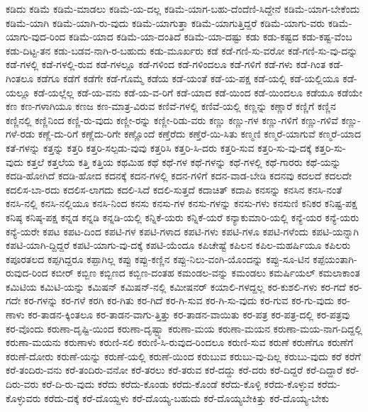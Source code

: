 {ಕಡಿದು
ಕಡಿಮೆ
ಕಡಿಮೆ-ಮಾಡಲು
ಕಡಿಮೆ-ಯ-ದಲ್ಲ
ಕಡಿಮೆ-ಯಾಗ-ಬಹು-ದೆಂದೆಣಿ-ಸಿದ್ದೇನೆ
ಕಡಿಮೆ-ಯಾಗ-ಬೇಕೆಂದು
ಕಡಿಮೆ-ಯಾಗಿ
ಕಡಿಮೆ-ಯಾಗಿ-ರು-ವುದು
ಕಡಿಮೆ-ಯಾಗುತ್ತಾ
ಕಡಿಮೆ-ಯಾಗುತ್ತಿದ್ದರೆ
ಕಡಿಮೆ-ಯಾಗು-ವರು
ಕಡಿಮೆ-ಯಾಗು-ವುದ-ರಿಂದ
ಕಡಿಮೆ-ಯಾದ
ಕಡಿಮೆ-ಯಾ-ದಂತಿದೆ
ಕಡಿಮೆ-ಯಾ-ದಷ್ಟು
ಕಡು
ಕಡು-ಕಷ್ಟದ
ಕಡು-ಕಷ್ಟ-ವೆಂಬ
ಕಡು-ದಿಟ್ಟ-ತನ
ಕಡು-ಬಡವ-ನಾಗಿ-ರ-ಬಹುದು
ಕಡು-ಮೂರ್ಖರು
ಕಡೆ
ಕಡೆ-ಗಣಿ-ಸು-ವರೋ
ಕಡೆ-ಗಣಿ-ಸು-ವು-ದನ್ನು
ಕಡೆ-ಗಳಲ್ಲಿ
ಕಡೆ-ಗಳಲ್ಲಿ-ರುವ
ಕಡೆ-ಗಳಲ್ಲೂ
ಕಡೆ-ಗಳಿಂದ
ಕಡೆ-ಗಳಿಂದಲೂ
ಕಡೆ-ಗಳಿಗೆ
ಕಡೆ-ಗಳು
ಕಡೆ-ಗಿಂತ
ಕಡೆ-ಗಿಂತಲೂ
ಕಡೆಗೂ
ಕಡೆಗೆ
ಕಡೆಗೇ
ಕಡೆ-ಗೊಮ್ಮೆ
ಕಡೆಯ
ಕಡೆ-ಯಂತೆ
ಕಡೆ-ಯ-ಪಕ್ಷ
ಕಡೆ-ಯಲ್ಲಿ
ಕಡೆ-ಯಲ್ಲಿಯೂ
ಕಡೆ-ಯಲ್ಲೂ
ಕಡೆ-ಯಲ್ಲೆಲ್ಲ
ಕಡೆ-ಯ-ವನು
ಕಡೆ-ಯ-ವ-ರಿಗೆ
ಕಡೆ-ಯಾದ
ಕಡೆ-ಯಿಂದ
ಕಡೆ-ಯಿಂದಲೂ
ಕಡೆಯೂ
ಕಡೆಯೇ
ಕಣ
ಕಣ-ಗಳಾಗಿಯೂ
ಕಣಜ
ಕಣ-ಮಾತ್ರ-ವಿರುವ
ಕಣಿವೆ-ಗಳಲ್ಲಿ
ಕಣಿವೆ-ಯಲ್ಲಿ
ಕಣ್ಣನ್ನು
ಕಣ್ಣಾರೆ
ಕಣ್ಣಿಗೆ
ಕಣ್ಣಿನ
ಕಣ್ಣಿನಲ್ಲಿ
ಕಣ್ಣಿನಿಂದ
ಕಣ್ಣಿ-ರು-ವುದು
ಕಣ್ಣೀ-ರನ್ನು
ಕಣ್ಣೀ-ರಿಡು-ವರು
ಕಣ್ಣು
ಕಣ್ಣು-ಗಳ
ಕಣ್ಣು-ಗಳಿಗೆ
ಕಣ್ಣು-ಗಳಿವೆ
ಕಣ್ಣು-ಗಳೆ-ರಡು
ಕಣ್ಣೆ-ದು-ರಿಗೆ
ಕಣ್ಣೆದು-ರಿಗೇ
ಕಣ್ಣೊಂದೆ
ಕಣ್ತೆರೆದು
ಕಣ್ತೆರೆ-ಯಿ-ಸಿತು
ಕಣ್ಮಣಿ
ಕಣ್ಮರೆ-ಯಾಗುವೆ
ಕಣ್ಮರೆ-ಯಾದ
ಕತೆ-ಗಳನ್ನು
ಕತ್ತನ್ನು
ಕತ್ತರಿ
ಕತ್ತರಿ-ಸಲ್ಪಡು-ವುವು
ಕತ್ತರಿಸಿ
ಕತ್ತರಿ-ಸಿ-ದರು
ಕತ್ತರಿ-ಸುವ
ಕತ್ತರಿ-ಸು-ವು-ದಕ್ಕೆ
ಕತ್ತರಿ-ಸು-ವುದು
ಕತ್ತಲೆ
ಕತ್ತಲೆಯ
ಕತ್ತಿ
ಕತ್ತಿಯ
ಕಥಮಿಹ
ಕಥೆ
ಕಥೆ-ಗಳ
ಕಥೆ-ಗಳನ್ನು
ಕಥೆ-ಗಳಲ್ಲಿ
ಕಥೆ-ಗಾರರು
ಕಥೆ-ಯನ್ನು
ಕದಡಿ-ಹೋಗಿದೆ
ಕದಡಿ-ಹೋದ
ಕದನಕ್ಕೆ
ಕದನ-ಗಳಲ್ಲಿ
ಕದನ-ಗಳಿಗೆ
ಕದನ-ವಾಡ-ಬೇಡಿ
ಕದನವು
ಕದಲದೆ
ಕದಲದೇ
ಕದಲಿಸ-ಬಾ-ರದು
ಕದಲಿಸ-ಲಾಗದು
ಕದಲಿ-ಸಿದೆ
ಕದಲಿ-ಸುತ್ತದೆ
ಕದಾಚಿತ್
ಕದಾಪಿ
ಕನಸನ್ನು
ಕನಸಿನ
ಕನಸಿ-ನಂತೆ
ಕನಸಿ-ನಲ್ಲಿ
ಕನಸಿ-ನಲ್ಲಿಯೂ
ಕನಸಿ-ನಿಂದ
ಕನಸು
ಕನಸು-ಗಳ
ಕನಸು-ಗಳನ್ನು
ಕನಸು-ಗಳು
ಕನಸುಣಿ
ಕನಿಕರ
ಕನಿಷ್ಟ-ಪಕ್ಷ
ಕನಿಷ್ಠ
ಕನಿಷ್ಠ-ಪಕ್ಷ
ಕನ್ನಡ
ಕನ್ನಡಿ
ಕನ್ನಡಿ-ಯಲ್ಲಿ
ಕನ್ನಿಕೆ-ಯರು
ಕನ್ನಿಕೆ-ಯರೆ
ಕನ್ಯಾಕುಮಾರಿ-ಯಲ್ಲಿ
ಕನ್ಯೆ-ಯರ
ಕನ್ಯೆ-ಯರು
ಕನ್ಯೆ-ಯರೇ
ಕಪಟ
ಕಪಟ-ದಿಂದ
ಕಪಟಿ-ಗಳ
ಕಪಟಿ-ಗಳಾದ
ಕಪಟಿ-ಗಳು
ಕಪಟಿ-ಗಳೂ
ಕಪಟಿ-ಗಳೆಂದು
ಕಪಟಿ-ಯನ್ನಾಗಿ
ಕಪಟಿ-ಯಾಗಿ-ದ್ದಿದ್ದರೆ
ಕಪಟಿ-ಯಾಗು-ವು-ದಕ್ಕೆ
ಕಪಟಿ-ಯೆಂದೂ
ಕಪಿಚೇಷ್ಟೆ
ಕಪಿಲನ
ಕಪಿಲ-ಮಹರ್ಷಿಯೂ
ಕಪಿಲರು
ಕಪೂರತಲದ
ಕಪ್ಪಗಿದ್ದರೂ
ಕಪ್ಪಾಗಿಲ್ಲ
ಕಪ್ಪು
ಕಪ್ಪು-ಕಣ್ಣಿನ
ಕಪ್ಪು-ನಿಲು-ವಂಗಿ-ಯೊಂದನ್ನು
ಕಪ್ಪು-ಸೂ-ಟಿನ
ಕಪ್ಪೆಯಂತಾಗಿ-ರುವುದ-ರಿಂದ
ಕಬೀರ್
ಕಬ್ಬಿಣ
ಕಬ್ಬಿಣದ
ಕಬ್ಬಿಣ-ದಂತಹ
ಕಮಂಡಲ-ವನ್ನು
ಕಮಂಡಲು
ಕಮರ್ಷಿಯಲ್‌
ಕಮಲಾಕಾಂತ
ಕಮಿಟಿಯ
ಕಮಿಟಿ-ಯನ್ನು
ಕಮಿಷನ್
ಕಮಿಷನ್‌-ನಲ್ಲಿ
ಕಮೀಷನರ್
ಕಯಾಲಿ-ಗಳದ್ದಲ್ಲ
ಕರ-ಕುಶಲಿ-ಗಳು
ಕರ-ಗದೆ
ಕರ-ಗದೇ
ಕರ-ಗಳನ್ನು
ಕರ-ಗಳೆ
ಕರಗಿ
ಕರ-ಗಿತು
ಕರ-ಗಿದೆ
ಕರ-ಗಿ-ಸುವ
ಕರ-ಗಿ-ಸು-ವುದು
ಕರ-ಗುವ
ಕರ-ಗು-ವುದು
ಕರ-ಣಾಳು
ಕರ-ತಾಡನ-ಕ್ಕಿಂತಲೂ
ಕರ-ತಾಡನ-ವಾಗು-ತ್ತಿತ್ತು
ಕರ-ತಾಡನ-ವಾಯಿತು
ಕರ-ಪತ್ರ
ಕರ-ಪತ್ರ-ದಲ್ಲಿ
ಕರ-ಪತ್ರವು
ಕರ-ವೊಂದು
ಕರುಣಾ-ದೃಷ್ಟಿ-ಯಿಂದ
ಕರುಣಾ-ದೃಷ್ಟ್ಯಾ
ಕರುಣಾ-ಮಯ
ಕರುಣಾ-ಮಯನ
ಕರುಣಾ-ಮಯ-ನಾಗ-ದಿದ್ದಲ್ಲಿ
ಕರುಣಾ-ಮಯನು
ಕರುಣಾಳು
ಕರುಣಿ-ಸಲಿ
ಕರುಣಿ-ಸಿ-ರುವುದ-ರಿಂದಲೂ
ಕರುಣಿ-ಸುವ
ಕರುಣೆ
ಕರುಣೆಗೂ
ಕರುಣೆಗೆ
ಕರುಣೆ-ದೋರು
ಕರುಣೆ-ಯನ್ನು
ಕರುಣೆ-ಯಲ್ಲಿ
ಕರುಣೆ-ಯಿಂದ
ಕರುಬುವ
ಕರುಬು-ವು-ದಿಲ್ಲ
ಕರುಬು-ವುದು
ಕರೆ
ಕರೆಗೆ
ಕರೆ-ತಂದಿರು-ವನು
ಕರೆ-ತಂದಿರು-ವನೋ
ಕರೆ-ತರಲು
ಕರೆ-ತರುವ
ಕರೆ-ದದ್ದು
ಕರೆ-ದರು
ಕರೆ-ದಿದ್ದರೆ
ಕರೆ-ದಿದ್ದಾರೆ
ಕರೆ-ದಿರು-ವರು
ಕರೆ-ದಿ-ರು-ವುದು
ಕರೆದು
ಕರೆದು-ಕೊಂಡು
ಕರೆದು-ಕೊಂಡೆ
ಕರೆದು-ಕೊಳ್ಳಿ
ಕರೆದು-ಕೊಳ್ಳುವ
ಕರೆದು-ಕೊಳ್ಳುವರು
ಕರೆದು-ದಕ್ಕೆ
ಕರೆ-ದೊಯ್ದಳು
ಕರೆ-ದೊಯ್ಯ-ಬಹುದು
ಕರೆ-ದೊಯ್ಯಬೇಕಿತ್ತು
ಕರೆ-ದೊಯ್ಯ-ಬೇಕು
}
